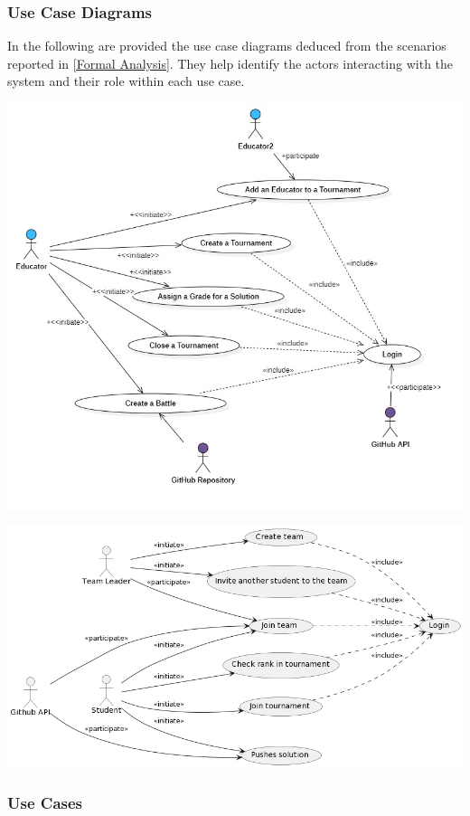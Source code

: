 \documentclass{article}
\begin{document}
\subsubsection{Use Case Diagrams}
In the following are provided the use case diagrams deduced from the scenarios reported in \ref{Formal Analysis}. They help identify the actors interacting with the system and their role within each use case. 

\begin{center}
    \includegraphics[width=0.8\linewidth]{EducatorUseCase.jpg}
  \label{fig:usecaseeducator}
\end{center}

\begin{center}
    \includegraphics[width=0.9\linewidth]{image19.png}
  \label{fig:usecasestudent}
\end{center}
\newpage
\subsubsection{Use Cases}
\end{document}
